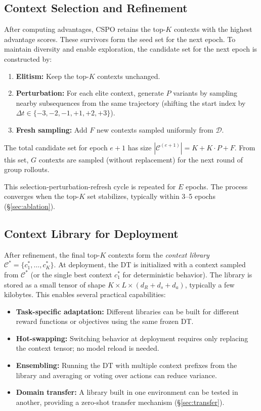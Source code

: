 \documentclass{article}
\newcommand{\cspo}{\textsc{CSPO}}
\newcommand{\cC}{\mathcal{C}}
\newcommand{\cD}{\mathcal{D}}
\begin{document}
\subsection{Context Selection and Refinement}
\label{sec:method_selection}

After computing advantages, \cspo{} retains the top-$K$ contexts with the highest advantage scores. These survivors form the seed set for the next epoch. To maintain diversity and enable exploration, the candidate set for the next epoch is constructed by:
\begin{enumerate}
    \item \textbf{Elitism:} Keep the top-$K$ contexts unchanged.
    \item \textbf{Perturbation:} For each elite context, generate $P$ variants by sampling nearby subsequences from the same trajectory (shifting the start index by $\Delta t \in \{-3, -2, -1, +1, +2, +3\}$).
    \item \textbf{Fresh sampling:} Add $F$ new contexts sampled uniformly from $\cD$.
\end{enumerate}
The total candidate set for epoch $e+1$ has size $|\cC^{(e+1)}| = K + K \cdot P + F$. From this set, $G$ contexts are sampled (without replacement) for the next round of group rollouts.

This selection-perturbation-refresh cycle is repeated for $E$ epochs. The process converges when the top-$K$ set stabilizes, typically within 3--5 epochs (\S\ref{sec:ablation}).

\subsection{Context Library for Deployment}
\label{sec:method_library}

After refinement, the final top-$K$ contexts form the \emph{context library} $\cC^* = \{c_1^*, \ldots, c_K^*\}$. At deployment, the DT is initialized with a context sampled from $\cC^*$ (or the single best context $c_1^*$ for deterministic behavior). The library is stored as a small tensor of shape $K \times L \times (d_R + d_s + d_a)$, typically a few kilobytes. This enables several practical capabilities:

\begin{itemize}
    \item \textbf{Task-specific adaptation:} Different libraries can be built for different reward functions or objectives using the same frozen DT.
    \item \textbf{Hot-swapping:} Switching behavior at deployment requires only replacing the context tensor; no model reload is needed.
    \item \textbf{Ensembling:} Running the DT with multiple context prefixes from the library and averaging or voting over actions can reduce variance.
    \item \textbf{Domain transfer:} A library built in one environment can be tested in another, providing a zero-shot transfer mechanism (\S\ref{sec:transfer}).
\end{itemize}
\end{document}
